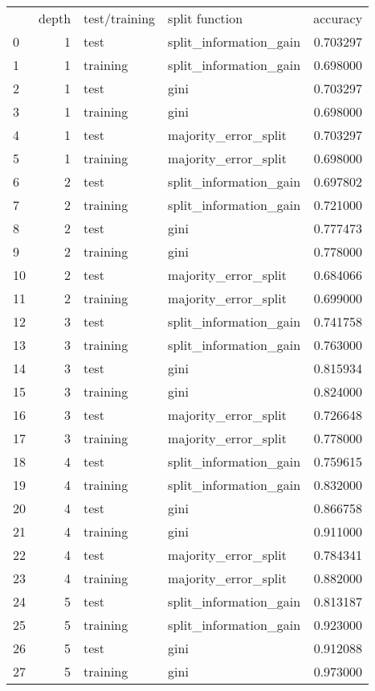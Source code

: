 \begin{tabular}{lrllr}
 & depth & test/training & split function & accuracy \\
0 & 1 & test & split_information_gain & 0.703297 \\
1 & 1 & training & split_information_gain & 0.698000 \\
2 & 1 & test & gini & 0.703297 \\
3 & 1 & training & gini & 0.698000 \\
4 & 1 & test & majority_error_split & 0.703297 \\
5 & 1 & training & majority_error_split & 0.698000 \\
6 & 2 & test & split_information_gain & 0.697802 \\
7 & 2 & training & split_information_gain & 0.721000 \\
8 & 2 & test & gini & 0.777473 \\
9 & 2 & training & gini & 0.778000 \\
10 & 2 & test & majority_error_split & 0.684066 \\
11 & 2 & training & majority_error_split & 0.699000 \\
12 & 3 & test & split_information_gain & 0.741758 \\
13 & 3 & training & split_information_gain & 0.763000 \\
14 & 3 & test & gini & 0.815934 \\
15 & 3 & training & gini & 0.824000 \\
16 & 3 & test & majority_error_split & 0.726648 \\
17 & 3 & training & majority_error_split & 0.778000 \\
18 & 4 & test & split_information_gain & 0.759615 \\
19 & 4 & training & split_information_gain & 0.832000 \\
20 & 4 & test & gini & 0.866758 \\
21 & 4 & training & gini & 0.911000 \\
22 & 4 & test & majority_error_split & 0.784341 \\
23 & 4 & training & majority_error_split & 0.882000 \\
24 & 5 & test & split_information_gain & 0.813187 \\
25 & 5 & training & split_information_gain & 0.923000 \\
26 & 5 & test & gini & 0.912088 \\
27 & 5 & training & gini & 0.973000 \\

\end{tabular}
